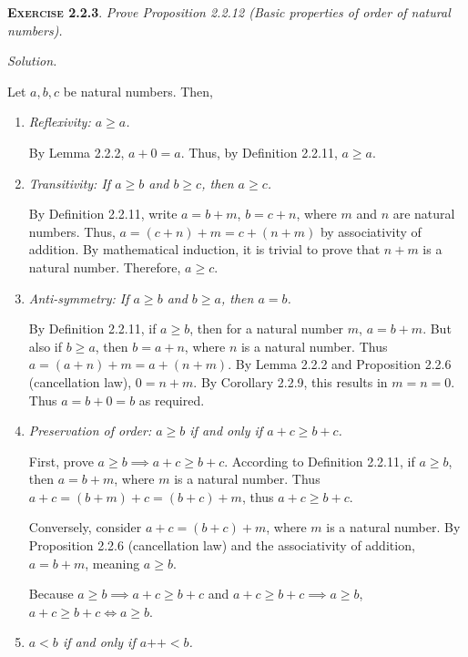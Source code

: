 \documentclass[12pt]{article}
\newcommand{\succr}[1]{#1 \textrm{++}}
\theoremstyle{remark}
\newenvironment{exer}[2]{
    \noindent \setlength{\parskip}{1em}%
    \textsc{\textbf{Exercise #1}}. \textit{#2} \par
    \noindent \textit{Solution.} %
}{\bigskip}
\begin{document}
\begin{exer}{2.2.3}{
    Prove Proposition 2.2.12 (Basic properties of order of natural numbers).
}
    Let $a, b, c$ be natural numbers. Then,
    \begin{enumerate}[label=(\alph*)]
        \item \textit{Reflexivity: $a \ge a$.}
        
            By Lemma 2.2.2, $a + 0 = a$. Thus, by Definition 2.2.11, $a \ge a$.

        \item \textit{Transitivity: If  $a \ge b$ and $b \ge c$, then $a \ge c$.}
        
            By Definition 2.2.11, write $a = b + m$, $b = c + n$, where $m$ and $n$ are natural numbers.
            Thus, $a = (c + n) + m = c + (n + m)$ by associativity of addition.
            By mathematical induction, it is trivial to prove that $n + m$ is a natural number.
            Therefore, $a \ge c$.

        \item \textit{Anti-symmetry: If $a \ge b$ and $b \ge a$, then $a = b$.}

            By Definition 2.2.11, if $a \ge b$, then for a natural number $m$, $a = b + m$.
            But also if $b \ge a$, then $b = a + n$, where $n$ is a natural number.
            Thus $a = (a + n) + m = a + (n + m)$.
            By Lemma 2.2.2 and Proposition 2.2.6 (cancellation law), $0 = n + m$.
            By Corollary 2.2.9, this results in $m = n = 0$.
            Thus $a = b + 0 = b$ as required.
            
        \item \textit{Preservation of order: $a \ge b$ if and only if $a + c \ge b + c$.}

            First, prove $a \ge b \implies a + c \ge b + c$.
            According to Definition 2.2.11, if $a \ge b$, then $a = b + m$, where $m$ is a natural number.
            Thus $a + c = (b + m) + c = (b + c) + m$, thus $a + c \ge b + c$.

            Conversely, consider $a + c = (b + c) + m$, where $m$ is a natural number.
            By Proposition 2.2.6 (cancellation law) and the associativity of addition, $a = b + m$, meaning $a \ge b$.

            Because $a \ge b \implies a + c \ge b + c$ and $a + c \ge b + c \implies a \ge b$, $a + c \ge b + c \iff a \ge b$.

        \item \textit{$a < b$ if and only if $\succr{a} < b$.}


\end{enumerate}
\end{exer}
\end{document}
